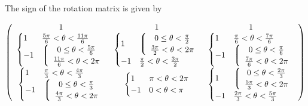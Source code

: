 The sign of the rotation matrix is given by

\begin{equation}
\left(
\begin{array}{ccc}
1 & 1  & 1 \\
\begin{cases}
   1 & \frac{5 \pi }{6}<\theta <\frac{11 \pi }{6} \\
 -1 & \left\lgroup \begin{array}{c} 0\leq \theta <\frac{5 \pi }{6} \\ \frac{11 \pi }{6}<\theta <2 \pi  \end{array} \right.\\
\end{cases}
 &
\begin{cases}
 1   & \left\lgroup \begin{array}{c} 0\leq \theta <\frac{\pi }{2} \\ \frac{3 \pi }{2}<\theta <2 \pi  \end{array} \right.\\
 -1 & \frac{\pi }{2}<\theta <\frac{3 \pi }{2} \\
\end{cases}
 &
\begin{cases}
 1 & \frac{\pi}{6}<\theta <\frac{7 \pi }{6} \\
 -1 & \left\lgroup \begin{array}{c}  0\leq \theta <\frac{\pi}{6} \\ \frac{7 \pi }{6}<\theta <2 \pi  \end{array} \right.\\
\end{cases}
 \\

\begin{cases}
 1 & \frac{\pi }{3}<\theta <\frac{4 \pi }{3} \\
 -1 & \left\lgroup \begin{array}{c} 0 \leq \theta <\frac{\pi }{3} \\ \frac{4 \pi }{3}<\theta <2 \pi \end{array} \right. \\
\end{cases}
 &
\begin{cases}
 1 & \pi <\theta <2 \pi  \\
 -1 & 0<\theta <\pi  \\
\end{cases}
 &
\begin{cases}
   1 & \left\lgroup \begin{array}{c} 0\leq \theta <\frac{2 \pi }{3} \\ \frac{5 \pi }{3}<\theta <2 \pi  \end{array} \right.\\
 -1 & \frac{2 \pi }{3}<\theta <\frac{5 \pi }{3} \\
\end{cases}
 \\
\end{array}
\right)
\end{equation}

